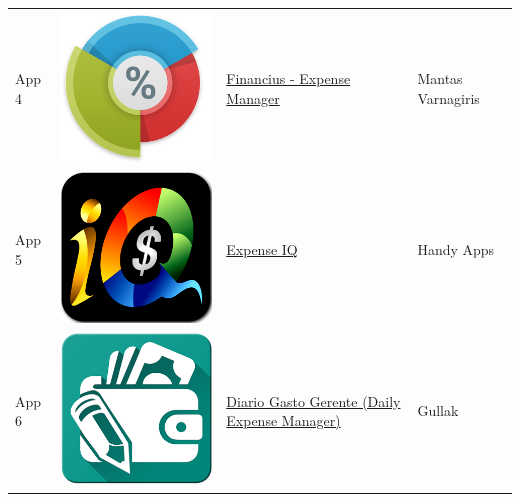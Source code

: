 \begin{table}
\begin{tabular}{ | l | c | l | l | }
App 4 & \includegraphics[scale=0.05]{A04_icon.png} & \href{https://play.google.com/store/apps/details?id=com.code44.finance}{Financius - Expense Manager} & Mantas Varnagiris \\

App 5 & \includegraphics[scale=0.05]{A05_icon.png} & \href{https://play.google.com/store/apps/details?id=com.handyapps.expenseiq}{Expense IQ} & Handy Apps \\

App 6 & \includegraphics[scale=0.05]{A06_icon.png} & \href{https://play.google.com/store/apps/details?id=com.techahead.ExpenseManager}{Diario Gasto Gerente (Daily Expense Manager)} & Gullak \\


\end{tabular}
\end{table}
